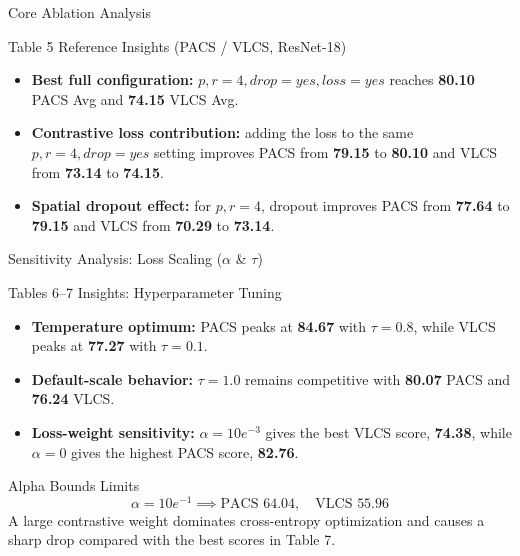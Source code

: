 \documentclass[t, aspectratio=169]{beamer} %
\begin{document}
	\begin{frame}{Core Ablation Analysis}
		\begin{block}{Table 5 Reference Insights (PACS / VLCS, ResNet-18)}
			\begin{itemize}
				\item \textbf{Best full configuration:} $p, r=4, drop=yes, loss=yes$ reaches \textbf{80.10} PACS Avg and \textbf{74.15} VLCS Avg.
				\item \textbf{Contrastive loss contribution:} adding the loss to the same $p, r=4, drop=yes$ setting improves PACS from \textbf{79.15} to \textbf{80.10} and VLCS from \textbf{73.14} to \textbf{74.15}.
				\item \textbf{Spatial dropout effect:} for $p, r=4$, dropout improves PACS from \textbf{77.64} to \textbf{79.15} and VLCS from \textbf{70.29} to \textbf{73.14}.
			\end{itemize}
		\end{block}
	\end{frame}

	\begin{frame}{Sensitivity Analysis: Loss Scaling ($\alpha$ \& $\tau$)}
		\begin{block}{Tables 6--7 Insights: Hyperparameter Tuning}
			\begin{itemize}
				\item \textbf{Temperature optimum:} PACS peaks at \textbf{84.67} with $\tau=0.8$, while VLCS peaks at \textbf{77.27} with $\tau=0.1$.
				\item \textbf{Default-scale behavior:} $\tau=1.0$ remains competitive with \textbf{80.07} PACS and \textbf{76.24} VLCS.
				\item \textbf{Loss-weight sensitivity:} $\alpha=10e^{-3}$ gives the best VLCS score, \textbf{74.38}, while $\alpha=0$ gives the highest PACS score, \textbf{82.76}.
			\end{itemize}
		\end{block}
		\begin{alertblock}{Alpha Bounds Limits }
			\[ \alpha = 10e^{-1} \implies \text{PACS } 64.04,\quad \text{VLCS } 55.96 \]
			A large contrastive weight dominates cross-entropy optimization and causes a sharp drop compared with the best scores in Table 7.
		\end{alertblock}
	\end{frame}

\end{document}
